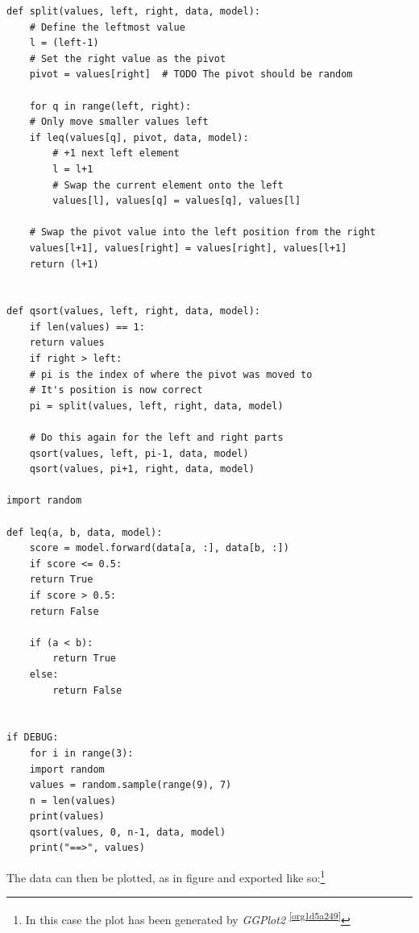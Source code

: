 \documentclass[a4paper,11pt,twoside]{article}
\begin{document}
\begin{verbatim}
def split(values, left, right, data, model):
    # Define the leftmost value
    l = (left-1)
    # Set the right value as the pivot
    pivot = values[right]  # TODO The pivot should be random

    for q in range(left, right):
	# Only move smaller values left
	if leq(values[q], pivot, data, model):
	    # +1 next left element
	    l = l+1
	    # Swap the current element onto the left
	    values[l], values[q] = values[q], values[l]

    # Swap the pivot value into the left position from the right
    values[l+1], values[right] = values[right], values[l+1]
    return (l+1)


def qsort(values, left, right, data, model):
    if len(values) == 1:
	return values
    if right > left:
	# pi is the index of where the pivot was moved to
	# It's position is now correct
	pi = split(values, left, right, data, model)

	# Do this again for the left and right parts
	qsort(values, left, pi-1, data, model)
	qsort(values, pi+1, right, data, model)

import random

def leq(a, b, data, model):
    score = model.forward(data[a, :], data[b, :])
    if score <= 0.5:
	return True
    if score > 0.5:
	return False

	if (a < b):
	    return True
	else:
	    return False


if DEBUG:
    for i in range(3):
	import random
	values = random.sample(range(9), 7)
	n = len(values)
	print(values)
	qsort(values, 0, n-1, data, model)
	print("==>", values)

\end{verbatim}

The data can then be plotted, as in figure and exported like so:\footnote{In this case the plot has been generated by \emph{GGPlot2} \textsuperscript{\ref{org1d5a249}}}
\end{document}
